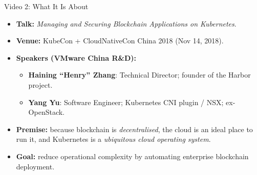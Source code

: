 \documentclass[aspectratio=169,11pt]{beamer}
\begin{document}
\begin{frame}{Video 2: What It Is About}
  \small
  \begin{itemize}
    \item \textbf{Talk:} \emph{Managing and Securing Blockchain Applications on Kubernetes}.
    \item \textbf{Venue:} KubeCon + CloudNativeCon China 2018 (Nov 14, 2018).
    \item \textbf{Speakers (VMware China R\&D):}
      \begin{itemize}
        \item \textbf{Haining ``Henry'' Zhang}: Technical Director; founder of the Harbor project.
        \item \textbf{Yang Yu}: Software Engineer; Kubernetes CNI plugin / NSX; ex-OpenStack.
      \end{itemize}
    \item \textbf{Premise:} because blockchain is \emph{decentralised}, the cloud is an ideal place to run it, and Kubernetes is a \emph{ubiquitous cloud operating system}.
    \item \textbf{Goal:} reduce operational complexity by automating enterprise blockchain deployment.
  \end{itemize}
\end{frame}
\end{document}
